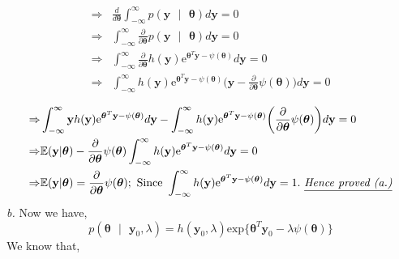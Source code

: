 \documentclass[11pt]{article}
\begin{document}
\begin{equation}
  \nonumber
  \begin{aligned}
    \Rightarrow & \frac{d}{d \bm{\theta}} \int_{-\infty}^{\infty} p(\mathbf{y \text{ }|\text{ } \bm{\theta}})d\mathbf{y} = 0\\
    \Rightarrow & \int_{-\infty}^{\infty} \frac{\partial}{\partial \bm{\theta}}p(\mathbf{y \text{ }|\text{ } \bm{\theta}})d\mathbf{y} = 0\\
    \Rightarrow & \int_{-\infty}^{\infty} \frac{\partial}{\partial \bm{\theta}}h(\mathbf{y})\text{e}^{\bm{\theta}^{T}\mathbf{y} - \psi(\bm{\theta})}d\mathbf{y} = 0\\
    \Rightarrow & \int_{-\infty}^{\infty} h(\mathbf{y})\text{e}^{\bm{\theta}^{T}\mathbf{y} - \psi(\bm{\theta})}\bigg(\mathbf{y} - \frac{\partial}{\partial \bm{\theta}}\psi(\bm{\theta})\bigg)d\mathbf{y} = 0\\
  \end{aligned}
\end{equation}
\begin{equation}
  \nonumber
  \begin{aligned}
    \Rightarrow & \int_{-\infty}^{\infty} \mathbf{y}h(\mathbf{y})\text{e}^{\bm{\theta}^{T}\mathbf{y} - \psi(\bm{\theta})}d\mathbf{y} - \int_{-\infty}^{\infty} h(\mathbf{y})\text{e}^{\bm{\theta}^{T}\mathbf{y} - \psi(\bm{\theta})} \bigg(\frac{\partial}{\partial \bm{\theta}}\psi(\bm{\theta})\bigg)d\mathbf{y} = 0\\
    \Rightarrow & \mathbb{E}(\mathbf{y} | \bm{\theta}) - \frac{\partial}{\partial \bm{\theta}}\psi(\bm{\theta})\int_{-\infty}^{\infty} h(\mathbf{y})\text{e}^{\bm{\theta}^{T}\mathbf{y} - \psi(\bm{\theta})}d\mathbf{y} = 0\\
    \Rightarrow & \mathbb{E}(\mathbf{y} | \bm{\theta}) = \frac{\partial}{\partial \bm{\theta}}\psi(\bm{\theta}); \text{ Since }\int_{-\infty}^{\infty} h(\mathbf{y})\text{e}^{\bm{\theta}^{T}\mathbf{y} - \psi(\bm{\theta})}d\mathbf{y} = 1. \text{ \emph{\underline{Hence proved (a.)}}}
  \end{aligned}
\end{equation}
\emph{b.} Now we have,
\begin{equation}
  \nonumber
  p(\bm{\theta} \text{ }| \text{ } \mathbf{y}_{0}, \lambda) = h(\mathbf{y}_{0}, \lambda)\text{exp}\{\bm{\theta}^{T}\mathbf{y}_{0} - \lambda \psi(\bm{\theta})\}
\end{equation}
We know that,
\end{document}
